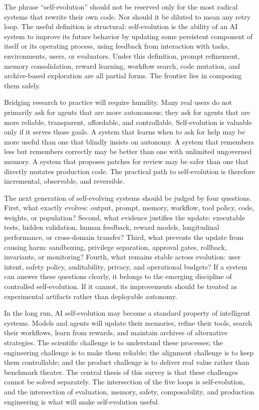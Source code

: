 The phrase ``self-evolution'' should not be reserved only for the most radical systems that rewrite their own code. Nor should it be diluted to mean any retry loop. The useful definition is structural: self-evolution is the ability of an AI system to improve its future behavior by updating some persistent component of itself or its operating process, using feedback from interaction with tasks, environments, users, or evaluators. Under this definition, prompt refinement, memory consolidation, reward learning, workflow search, code mutation, and archive-based exploration are all partial forms. The frontier lies in composing them safely.

Bridging research to practice will require humility. Many real users do not primarily ask for agents that are more autonomous; they ask for agents that are more reliable, transparent, affordable, and controllable. Self-evolution is valuable only if it serves those goals. A system that learns when to ask for help may be more useful than one that blindly insists on autonomy. A system that remembers less but remembers correctly may be better than one with unlimited ungoverned memory. A system that proposes patches for review may be safer than one that directly mutates production code. The practical path to self-evolution is therefore incremental, observable, and reversible.

The next generation of self-evolving systems should be judged by four questions. First, what exactly evolves: output, prompt, memory, workflow, tool policy, code, weights, or population? Second, what evidence justifies the update: executable tests, hidden validation, human feedback, reward models, longitudinal performance, or cross-domain transfer? Third, what prevents the update from causing harm: sandboxing, privilege separation, approval gates, rollback, invariants, or monitoring? Fourth, what remains stable across evolution: user intent, safety policy, auditability, privacy, and operational budgets? If a system can answer these questions clearly, it belongs to the emerging discipline of controlled self-evolution. If it cannot, its improvements should be treated as experimental artifacts rather than deployable autonomy.

In the long run, AI self-evolution may become a standard property of intelligent systems. Models and agents will update their memories, refine their tools, search their workflows, learn from rewards, and maintain archives of alternative strategies. The scientific challenge is to understand these processes; the engineering challenge is to make them reliable; the alignment challenge is to keep them controllable; and the product challenge is to deliver real value rather than benchmark theater. The central thesis of this survey is that these challenges cannot be solved separately. The intersection of the five loops is self-evolution, and the intersection of evaluation, memory, safety, composability, and production engineering is what will make self-evolution useful.
